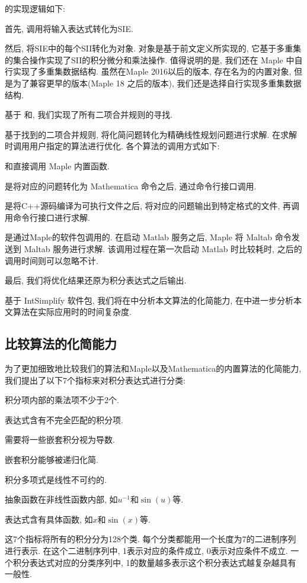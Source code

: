 的实现逻辑如下:
\begin{asparaenum}[Step 1.]
\item 首先, 调用将输入表达式转化为SIE.
\item 然后, 将SIE中的每个SII转化为对象. 对象是基于前文定义所实现的, 它基于多重集的集合操作实现了SII的积分\D 微分和乘法操作. 值得说明的是, 我们还在 Maple 中自行实现了多重集数据结构. 虽然在Maple 2016以后的版本, 存在名为的内置对象, 但是为了兼容更早的版本(Maple 18 之后的版本), 我们还是选择自行实现多重集数据结构.
\item 基于\D {}\D {} 和, 我们实现了所有二项合并规则的寻找.
\item 基于找到的二项合并规则, 将化简问题转化为精确线性规划问题进行求解. 在求解时调用用户指定的算法进行优化. 各个算法的调用方式如下:
\begin{compactitem}[\textbullet]
\item {}和直接调用 Maple 内置函数.
\item {}是将对应的问题转化为 Mathematica 命令之后, 通过命令行接口调用.
\item {}是将C++源码编译为可执行文件之后, 将对应的问题输出到特定格式的文件, 再调用命令行接口进行求解.
\item {}是通过Maple的软件包调用的. 在启动 Matlab 服务之后, Maple 将 Maltab 命令发送到 Maltab 服务进行求解. 该调用过程在第一次启动 Matlab 时比较耗时, 之后的调用时间则可以忽略不计.
\end{compactitem}
\item 最后, 我们将优化结果还原为积分表达式之后输出.
\end{asparaenum}

基于 IntSimplify 软件包, 我们将在中分析本文算法的化简能力, 在中进一步分析本文算法在实际应用时的时间复杂度. 

\subsection{比较算法的化简能力}\label{sec5.1-03}
为了更加细致地比较我们的算法和Maple以及Mathematica的内置算法的化简能力, 我们提出了以下7个指标来对积分表达式进行分类:
\begin{compactenum}[(1) ]
\item 积分项内部的乘法项不少于2个.
\item 表达式含有不完全匹配的积分项.
\item 需要将一些嵌套积分视为导数. 
\item 嵌套积分能够被递归化简.
\item 积分多项式是线性不可约的.
\item 抽象函数在非线性函数内部, 如$u^{-1}$和$\sin(u)$等.  
\item 表达式含有具体函数, 如$x$和$\sin(x)$等. 
\end{compactenum} 
这7个指标将所有的积分分为128个类. 每个分类都能用一个长度为7的二进制序列进行表示. 在这个二进制序列中, 1表示对应的条件成立, 0表示对应条件不成立. 一个积分表达式对应的分类序列中, 1的数量越多表示这个积分表达式越复杂\D 越具有一般性. 

